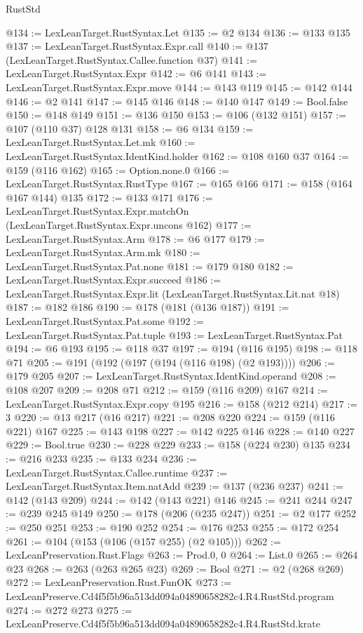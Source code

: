 \begin{lexlean}{RustStd}
\begin{coremodule}
@134 := LexLeanTarget.RustSyntax.Let
@135 := @2 @134
@136 := @133 @135
@137 := LexLeanTarget.RustSyntax.Expr.call
@140 := @137 (LexLeanTarget.RustSyntax.Callee.function @37)
@141 := LexLeanTarget.RustSyntax.Expr
@142 := @6 @141
@143 := LexLeanTarget.RustSyntax.Expr.move
@144 := @143 @119
@145 := @142 @144
@146 := @2 @141
@147 := @145 @146
@148 := @140 @147
@149 := Bool.false
@150 := @148 @149
@151 := @136 @150
@153 := @106 (@132 @151)
@157 := @107 (@110 @37) @128 @131
@158 := @6 @134
@159 := LexLeanTarget.RustSyntax.Let.mk
@160 := LexLeanTarget.RustSyntax.IdentKind.holder
@162 := @108 @160 @37
@164 := @159 (@116 @162)
@165 := Option.none.{0}
@166 := LexLeanTarget.RustSyntax.RustType
@167 := @165 @166
@171 := @158 (@164 @167 @144) @135
@172 := @133 @171
@176 := LexLeanTarget.RustSyntax.Expr.matchOn (LexLeanTarget.RustSyntax.Expr.uncons @162)
@177 := LexLeanTarget.RustSyntax.Arm
@178 := @6 @177
@179 := LexLeanTarget.RustSyntax.Arm.mk
@180 := LexLeanTarget.RustSyntax.Pat.none
@181 := @179 @180
@182 := LexLeanTarget.RustSyntax.Expr.succeed
@186 := LexLeanTarget.RustSyntax.Expr.lit (LexLeanTarget.RustSyntax.Lit.nat @18)
@187 := @182 @186
@190 := @178 (@181 (@136 @187))
@191 := LexLeanTarget.RustSyntax.Pat.some
@192 := LexLeanTarget.RustSyntax.Pat.tuple
@193 := LexLeanTarget.RustSyntax.Pat
@194 := @6 @193
@195 := @118 @37
@197 := @194 (@116 @195)
@198 := @118 @71
@205 := @191 (@192 (@197 (@194 (@116 @198) (@2 @193))))
@206 := @179 @205
@207 := LexLeanTarget.RustSyntax.IdentKind.operand
@208 := @108 @207
@209 := @208 @71
@212 := @159 (@116 @209) @167
@214 := LexLeanTarget.RustSyntax.Expr.copy @195
@216 := @158 (@212 @214)
@217 := 3
@220 := @13 @217 (@16 @217)
@221 := @208 @220
@224 := @159 (@116 @221) @167
@225 := @143 @198
@227 := @142 @225 @146
@228 := @140 @227
@229 := Bool.true
@230 := @228 @229
@233 := @158 (@224 @230) @135
@234 := @216 @233
@235 := @133 @234
@236 := LexLeanTarget.RustSyntax.Callee.runtime
@237 := LexLeanTarget.RustSyntax.Item.natAdd
@239 := @137 (@236 @237)
@241 := @142 (@143 @209)
@244 := @142 (@143 @221) @146
@245 := @241 @244
@247 := @239 @245 @149
@250 := @178 (@206 (@235 @247))
@251 := @2 @177
@252 := @250 @251
@253 := @190 @252
@254 := @176 @253
@255 := @172 @254
@261 := @104 (@153 (@106 (@157 @255) (@2 @105)))
@262 := LexLeanPreservation.Rust.Flags
@263 := Prod.{0, 0}
@264 := List.{0}
@265 := @264 @23
@268 := @263 (@263 @265 @23)
@269 := Bool
@271 := @2 (@268 @269)
@272 := LexLeanPreservation.Rust.FunOK
@273 := LexLeanPreserve.Cd4f5f5b96a513dd094a04890658282c4.R4.RustStd.program
@274 := @272 @273
@275 := LexLeanPreserve.Cd4f5f5b96a513dd094a04890658282c4.R4.RustStd.krate

\end{coremodule}
\end{lexlean}
